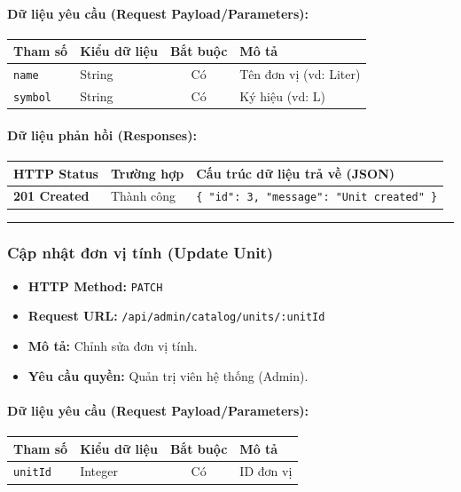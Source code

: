 \documentclass[12pt,a4paper]{article}
\begin{document}
\paragraph{Dữ liệu yêu cầu (Request Payload/Parameters):}
\begin{longtable}{|p{2.8cm}|p{2.2cm}|c|p{7.0cm}|}
\hline
\textbf{Tham số} & \textbf{Kiểu dữ liệu} & \textbf{Bắt buộc} & \textbf{Mô tả} \\ \hline
\endhead
\texttt{name} & String & Có & Tên đơn vị (vd: Liter) \\ \hline
\texttt{symbol} & String & Có & Ký hiệu (vd: L) \\ \hline
\end{longtable}

\paragraph{Dữ liệu phản hồi (Responses):}
\begin{longtable}{|p{2.8cm}|p{3.2cm}|p{8.0cm}|}
\hline
\textbf{HTTP Status} & \textbf{Trường hợp} & \textbf{Cấu trúc dữ liệu trả về (JSON)} \\ \hline
\endhead
\textbf{201 Created} & Thành công & \texttt{\{ "id": 3, "message": "Unit created" \}} \\ \hline
\end{longtable}

\vskip 0.4cm
\noindent\rule{\textwidth}{0.3pt}
\vskip 0.4cm

\subsubsection{Cập nhật đơn vị tính (Update Unit)}
\begin{itemize}[leftmargin=*]
    \item \textbf{HTTP Method:} \texttt{PATCH}
    \item \textbf{Request URL:} \texttt{/api/admin/catalog/units/:unitId}
    \item \textbf{Mô tả:} Chỉnh sửa đơn vị tính.
    \item \textbf{Yêu cầu quyền:} Quản trị viên hệ thống (Admin).
\end{itemize}

\paragraph{Dữ liệu yêu cầu (Request Payload/Parameters):}
\begin{longtable}{|p{2.8cm}|p{2.2cm}|c|p{7.0cm}|}
\hline
\textbf{Tham số} & \textbf{Kiểu dữ liệu} & \textbf{Bắt buộc} & \textbf{Mô tả} \\ \hline
\endhead
\texttt{unitId} & Integer & Có & ID đơn vị \\ \hline
\end{longtable}
\end{document}
